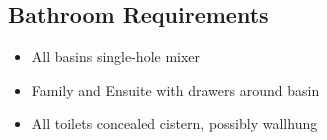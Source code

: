 \subsection{Bathroom Requirements}
\begin{itemize}
\item All basins single-hole mixer
\item Family and Ensuite with drawers around basin
\item All toilets concealed cistern, possibly wallhung
    
\end{itemize}
